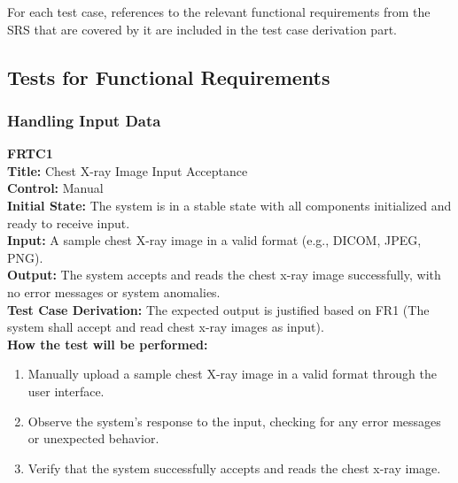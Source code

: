 \documentclass[12pt, titlepage]{article}
\begin{document}
For each test case, references to the relevant functional requirements from the SRS that are
covered by it are included in the test case derivation part.

\subsection{Tests for Functional Requirements}

\subsubsection{Handling Input Data}
\textbf{FRTC1}\\
\textbf{Title:} Chest X-ray Image Input Acceptance\\
\textbf{Control:} Manual\\
\textbf{Initial State:} The system is in a stable state with all components initialized and ready to receive input.\\
\textbf{Input:} A sample chest X-ray image in a valid format (e.g., DICOM, JPEG, PNG).\\
\textbf{Output:} The system accepts and reads the chest x-ray image successfully, with no error messages or system anomalies.\\
\textbf{Test Case Derivation:} The expected output is justified based on FR1 (The system shall accept and read chest x-ray images as input).\\
\textbf{How the test will be performed:}
\begin{enumerate}
  \item Manually upload a sample chest X-ray image in a valid format through the user interface.
  \item Observe the system's response to the input, checking for any error messages or unexpected behavior.
  \item Verify that the system successfully accepts and reads the chest x-ray image.
\end{enumerate}
\vspace{1em}
\end{document}
